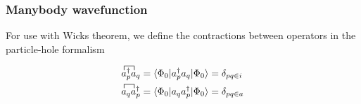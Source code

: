 \begin{frame}[fragile]
    \frametitle{Manybody wavefunction}

    For use with Wicks theorem, we define the contractions between operators in the particle-hole formalism

    \begin{align*}
        \contraction{}{a}{ {}^\dagger_p}{a} a^\dagger_p a_q =
            \bra{\Phi_0} a^\dagger_p a_q \ket{\Phi_0} &=
            \delta_{pq\in i} \\
            \contraction{}{a}{ {}_p}{a} a_q a_p^\dagger =
            \bra{\Phi_0} a_q a^\dagger_p \ket{\Phi_0} &=
            \delta_{pq\in a} \\
    \end{align*}
            
\end{frame}
        
